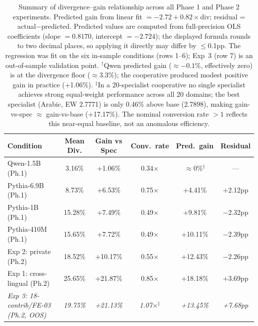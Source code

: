 \documentclass{article}
\begin{document}
\begin{table}[h]
\centering
\caption{Summary of divergence--gain relationship across all Phase 1 and Phase 2 experiments. Predicted gain from linear fit $= -2.72 + 0.82 \times \text{div}$; residual = actual$-$predicted. Predicted values are computed from full-precision OLS coefficients (slope $= 0.8170$, intercept $= -2.724$); the displayed formula rounds to two decimal places, so applying it directly may differ by $\leq$0.1pp. The regression was fit on the six in-sample conditions (rows 1--6); Exp~3 (row 7) is an out-of-sample validation point. $^{\dagger}$Qwen predicted gain ($\approx{-}0.1\%$, effectively zero) is at the divergence floor ($\approx$3.3\%); the cooperative produced modest positive gain in practice (+1.06\%). $^{\ddagger}$In a 20-specialist cooperative no single specialist achieves strong equal-weight performance across all 20 domains; the best specialist (Arabic, EW 2.7771) is only 0.46\% above base (2.7898), making gain-vs-spec $\approx$ gain-vs-base (+17.17\%). The nominal conversion rate $>1$ reflects this near-equal baseline, not an anomalous efficiency.}
\label{tab:divergence_gain}
\small
\begin{tabular}{lccccc}
\toprule
\textbf{Condition} & \textbf{Mean Div.} & \textbf{Gain vs Spec} & \textbf{Conv.\ rate} & \textbf{Pred.\ gain} & \textbf{Residual} \\
\midrule
Qwen-1.5B (Ph.1)            & 3.16\%  & +1.06\%  & 0.34$\times$ & $\approx$0\%$^{\dagger}$ & --- \\
Pythia-6.9B (Ph.1)          & 8.73\%  & +6.53\%  & 0.75$\times$ & +4.41\%  & +2.12pp \\
Pythia-1B (Ph.1)            & 15.28\% & +7.49\%  & 0.49$\times$ & +9.81\%  & $-$2.32pp \\
Pythia-410M (Ph.1)          & 15.65\% & +7.72\%  & 0.49$\times$ & +10.11\% & $-$2.39pp \\
Exp 2: private (Ph.2)       & 18.52\% & +10.17\% & 0.55$\times$ & +12.43\% & $-$2.26pp \\
Exp 1: cross-lingual (Ph.2) & 25.65\% & +21.87\% & 0.85$\times$ & +18.18\% & +3.69pp \\
\midrule
\textit{Exp 3: 18-contrib/FE-03 (Ph.2, OOS)} & \textit{19.75\%} & \textit{+21.13\%} & \textit{1.07$\times$$^{\ddagger}$} & \textit{+13.45\%} & \textit{+7.68pp} \\
\bottomrule
\end{tabular}
\end{table}
\end{document}
